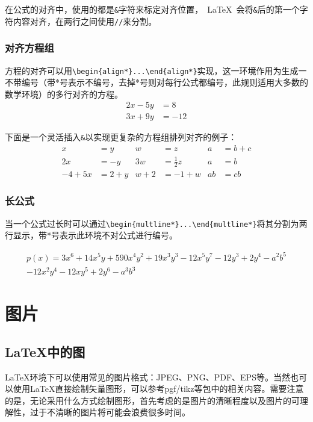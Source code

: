 在公式的对齐中，使用的都是\verb|&|字符来标定对齐位置，~\LaTeX~会将\verb|&|后的第一个字符内容对齐，在两行之间使用\verb|//|来分割。

\subsubsection{对齐方程组}

方程的对齐可以用\verb|\begin{align*}...\end{align*}|实现，这一环境作用为生成一不带编号（带*号表示不编号，去掉*号则对每行公式都编号，此规则适用大多数的数学环境）的多行对齐的方程。
\begin{align*} 
2x - 5y &=  8 \\ 
3x + 9y &=  -12
\end{align*}

下面是一个灵活插入\verb|&|以实现更复杂的方程组排列对齐的例子：
\begin{align*}
x&=y           &  w &=z              &  a&=b+c\\
2x&=-y         &  3w&=\frac{1}{2}z   &  a&=b\\
-4 + 5x&=2+y   &  w+2&=-1+w          &  ab&=cb
\end{align*}

\subsubsection{长公式}

当一个公式过长时可以通过\verb|\begin{multline*}...\end{multline*}|将其分割为两行显示，带*号表示此环境不对公式进行编号。

\begin{multline*}
p(x) = 3x^6 + 14x^5y + 590x^4y^2 + 19x^3y^3- 12x^5y^7 - 12y^3 + 2y^4 - a^2b^5\\ 
- 12x^2y^4 - 12xy^5 + 2y^6 - a^3b^3
\end{multline*}

\section{图片}

\subsection{\LaTeX 中的图}

\LaTeX 环境下可以使用常见的图片格式：JPEG、PNG、PDF、EPS等。当然也可以使用\LaTeX 直接绘制矢量图形，可以参考pgf/tikz等包中的相关内容。需要注意的是，无论采用什么方式绘制图形，首先考虑的是图片的清晰程度以及图片的可理解性，过于不清晰的图片将可能会浪费很多时间。

